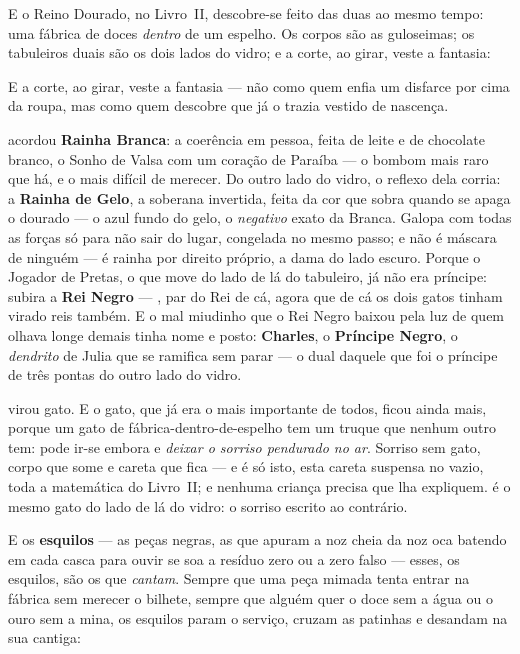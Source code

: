 \documentclass[livro.tex]{subfiles}
\begin{document}
\medskip

E o Reino Dourado, no Livro~II, descobre-se feito das duas ao mesmo tempo: uma
fábrica de doces \emph{dentro} de um espelho. Os corpos são as guloseimas; os
tabuleiros duais são os dois lados do vidro; e a corte, ao girar, veste a fantasia:

E a corte, ao girar, veste a fantasia --- não como quem enfia um disfarce por cima da
roupa, mas como quem descobre que já o trazia vestido de nascença.

\Yas acordou \textbf{Rainha Branca}: a coerência em pessoa, feita de leite e de
chocolate branco, o Sonho de Valsa com um coração de Paraíba --- o bombom mais raro
que há, e o mais difícil de merecer. Do outro lado do vidro, o reflexo dela corria: a
\textbf{Rainha de Gelo}, a soberana invertida, feita da cor que sobra quando se apaga o
dourado --- o azul fundo do gelo, o \emph{negativo} exato da Branca. Galopa com todas as
forças só para não sair do lugar, congelada no mesmo passo; e não é máscara de ninguém ---
é rainha por direito próprio, a dama do lado escuro. Porque o Jogador de Pretas, o que move
do lado de lá do tabuleiro, já não era príncipe: subira a \textbf{Rei Negro} --- \Ven , par
do Rei de cá, agora que de cá os dois gatos tinham virado reis também. E o mal miudinho que
o Rei Negro baixou pela luz de quem olhava longe demais tinha nome e posto: \textbf{Charles},
o \textbf{Príncipe Negro}, o \emph{dendrito} de Julia que se ramifica sem parar
--- o dual daquele que foi o príncipe de três pontas do outro lado do vidro.

\Ben virou gato. E o gato, que já era o mais importante de todos, ficou ainda mais,
porque um gato de fábrica-dentro-de-espelho tem um truque que nenhum outro tem: pode
ir-se embora e \emph{deixar o sorriso pendurado no ar}. Sorriso sem gato, corpo que
some e careta que fica --- e é só isto, esta careta suspensa no vazio, toda a
matemática do Livro~II; e nenhuma criança precisa que lha expliquem. \Drk é o mesmo
gato do lado de lá do vidro: o sorriso escrito ao contrário.

E os \textbf{esquilos} --- as peças negras, as que apuram a noz cheia da noz oca
batendo em cada casca para ouvir se soa a resíduo zero ou a zero falso --- esses, os
esquilos, são os que \emph{cantam}. Sempre que uma peça mimada tenta entrar na fábrica
sem merecer o bilhete, sempre que alguém quer o doce sem a água ou o ouro sem a mina,
os esquilos param o serviço, cruzam as patinhas e desandam na sua cantiga:
\end{document}
